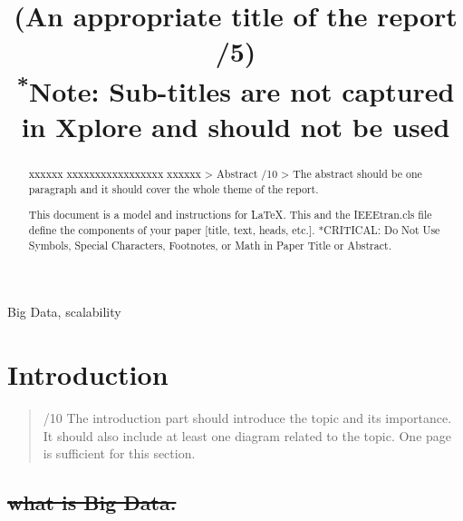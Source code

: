 \documentclass[conference]{IEEEtran}
\begin{document}
\title{(An appropriate title of the report /5)\\
{\footnotesize \textsuperscript{*}Note: Sub-titles are not captured in Xplore and
should not be used}
}

\author{
}

\maketitle

\begin{abstract}

xxxxxx xxxxxxxxxxxxxxxxx xxxxxx \textgreater{} Abstract /10
\textgreater{} The abstract should be one paragraph and it should cover
the whole theme of the report.

This document is a model and instructions for \LaTeX.
This and the IEEEtran.cls file define the components of your paper [title, text, heads, etc.]. *CRITICAL: Do Not Use Symbols, Special Characters, Footnotes, 
or Math in Paper Title or Abstract.
\end{abstract}

\begin{IEEEkeywords}
Big Data, scalability
\end{IEEEkeywords}

\hypertarget{introduction}{%
\section{Introduction}\label{introduction}}

\begin{quote}
/10 The introduction part should introduce the topic and its importance.
It should also include at least one diagram related to the topic. One
page is sufficient for this section.
\end{quote}

\hypertarget{what-is-big-data.}{%
\subsection{\texorpdfstring{\sout{what is Big
Data.}}{what is Big Data.}}\label{what-is-big-data.}}
\end{document}
